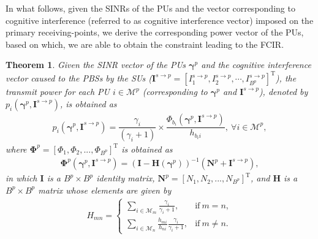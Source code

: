 \documentclass[journal,twoside]{IEEEtran}
\newcommand{\M}{\mathcal{M}}
\newcommand{\Phibold}{\boldsymbol{\Phi}}
\newcommand{\gammabold}{\boldsymbol{\gamma}}
\newcommand{\hup}[2]{h_{#1 #2}}
\newtheorem {theorem}{Theorem}
\begin{document}
	In what follows, given the SINRs of the PUs and the vector corresponding to cognitive interference (referred to as cognitive interference vector) imposed on the primary receiving-points, we derive the corresponding power vector of the PUs, based on which, we are able to obtain the constraint leading to the FCIR.
	\begin{theorem} 
		Given the SINR vector of the PUs $\gammabold^p$ and the cognitive interference vector caused to the PBSs by the SUs ($\mathbf{I}^{s\rightarrow p}=[I^{s \rightarrow p}_1,I^{s \rightarrow p}_2,\cdots,I^{s \rightarrow p}_{B^p}]^{\mathrm{T}}$), the transmit power for each PU $i\in\M^p$ (corresponding to  $\gammabold^p$ and $\mathbf{I}^{s\rightarrow p}$), denoted by $p_i(\gammabold^p,\mathbf{I}^{s\rightarrow p})$, is obtained as 
		\begin{align}
		\label{eq:p_s_2_p}
			p_i(\gammabold^p,\mathbf{I}^{s\rightarrow p})= \dfrac{\gamma_i}{(\gamma_i+1)} 
				\! \times \! 
			\dfrac{ \Phi_{b_i} \! \left(\gammabold^p,\mathbf{I}^{s\rightarrow p}\right)}{\hup{b_i}{i} } ,  \ \forall i\in\M^p,
		\end{align}
		where $\Phibold^p=[\Phi_{1}, \Phi_{2}, ..., \Phi_{B^p}]^{\mathrm{T}}$ is obtained as
		\begin{align}
		\label{eq:phi_s_2_p}
	 		\Phibold^p\left( \gammabold^p,\mathbf{I}^{s \rightarrow p} \right)= \left( \mathbf{I-H}(\gammabold^p) \right)^{-1} \left( \mathbf{N}^p + \mathbf{I}^{s \rightarrow p} \right),
		\end{align}
		in which $\mathbf{I}$ is a $B^p\times B^p$ identity matrix, $\mathbf{N}^p=[N_{1}, N_{2}, ..., N_{B^p}]^{\mathrm{T}}$, and $\mathbf{H}$ is a $B^p\times B^p$ matrix whose elements are given by
		\begin{align}
		\label{eq:H_elements2}
			H_{mn}=
			\begin{cases}
			\sum\limits_{i\in\M_{m}}{\!\! \frac{\gamma_i}{\gamma_i+1}}, & \mathrm{if\ } m=n, \\
			\sum\limits_{i\in\M_{n}}{\!\! \frac{\hup{m}{i}}{\hup{n}{i}} \frac{\gamma_i}{\gamma_i+1} }, & \mathrm{if\ } m\neq n.
			\end{cases}
		\end{align}
	\end{theorem}
\end{document}
